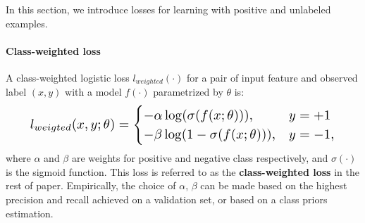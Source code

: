 
In this section, we introduce losses for learning with positive and unlabeled examples.

\paragraph{Class-weighted loss}

A class-weighted logistic loss $l_{weighted}(\cdot)$ for a pair of input feature and observed label $(x, y)$ with a model $f(\cdot)$ parametrized by $\theta$ is:
\begin{eqnarray}
\resizebox{0.9\columnwidth}{!}{$
l_{weigted}(x, y; \theta) =
  \begin{cases}
    - \alpha \log (\sigma(f(x; \theta))) , & y = +1 \\
    - \beta \log (1 - \sigma(f(x; \theta))), & y = -1,
  \end{cases}
$}
\end{eqnarray}
where $\alpha$ and $\beta$ are weights for positive and negative class respectively, and $\sigma(\cdot)$ is the sigmoid function.
This loss is referred to as the \textbf{class-weighted loss} in the rest of paper.
Empirically, the choice of $\alpha$, $\beta$ can be made based on the highest precision and recall achieved on a validation set, or based on a class priors estimation\cite{du2014class}.


